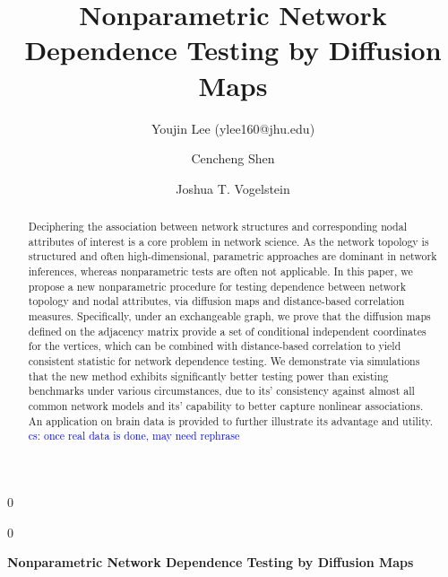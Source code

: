 \documentclass[11pt]{article}
\theoremstyle{definition}
\newcommand{\blind}{0}
\newcommand{\cs}[1]{\textcolor{blue}{cs: #1}}
\begin{document}
\def\spacingset#1{\renewcommand{\baselinestretch}%
{#1}\small\normalsize} \spacingset{1}

\title{\bf Nonparametric Network Dependence Testing by Diffusion Maps}
\blind
{\author[1]{Youjin Lee (ylee160@jhu.edu)} %
	\author[2]{Cencheng Shen} %
	\author[2,3,4]{Joshua T. Vogelstein}
  \date{}
	\maketitle
} \fi

	\blind
	{
		\bigskip
		\bigskip
		\bigskip
		\begin{center}
			{\LARGE\bf Nonparametric Network Dependence Testing by Diffusion Maps}
		\end{center}
		\medskip
	} \fi

\begin{abstract}
Deciphering the association between network structures and corresponding nodal attributes of interest is a core problem in network science. As the network topology is structured and often high-dimensional, parametric approaches are dominant in network inferences, whereas nonparametric tests are often not applicable. In this paper, we propose a new nonparametric procedure for testing dependence between network topology and nodal attributes, via diffusion maps and distance-based correlation measures. Specifically, under an exchangeable graph, we prove that the diffusion maps defined on the adjacency matrix provide a set of conditional independent coordinates for the vertices, which can be combined with distance-based correlation to yield consistent statistic for network dependence testing. We demonstrate via simulations that the new method exhibits significantly better testing power than existing benchmarks under various circumstances, due to its' consistency against almost all common network models and its' capability to better capture nonlinear associations. An application on brain data is provided to further illustrate its advantage and utility. \cs{once real data is done, may need rephrase}
\end{abstract}
\end{document}

